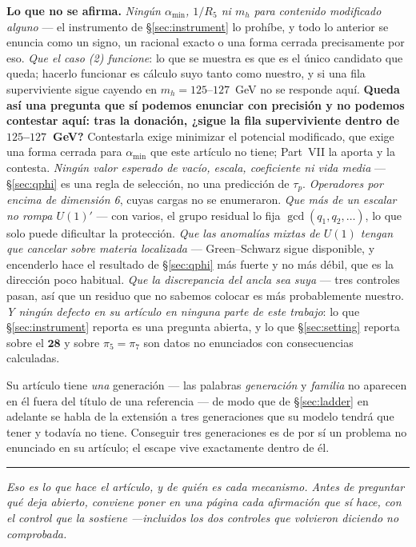 \documentclass[11pt,a4paper]{article}
\newcommand{\rep}[1]{\mathbf{#1}}
\newcommand{\amin}{\alpha_{\min}}
\newcommand{\bridge}[1]{\par\medskip\noindent
  \textcolor{hdrblue!45}{\rule{2.2cm}{0.6pt}}\;\;\parbox[t]{0.84\textwidth}{\small\itshape
  \textcolor{hdrblue!85}{#1}}\par\medskip}
\begin{document}
\textbf{Lo que no se afirma.}
\emph{Ningún $\amin$, $1/R_5$ ni $m_h$ para contenido modificado alguno} --- el instrumento de
\S\ref{sec:instrument} lo prohíbe, y todo lo anterior se enuncia como un signo, un racional exacto o
una forma cerrada precisamente por eso. \emph{Que el caso (2) funcione}: lo que se muestra es que es
el único candidato que queda; hacerlo funcionar es cálculo suyo tanto como nuestro, y si una fila
superviviente sigue cayendo en $m_h=125$--$127$~GeV no se responde aquí. \textbf{Queda así una
pregunta que sí podemos enunciar con precisión y no podemos contestar aquí: tras la donación,
¿sigue la fila superviviente dentro de $125$--$127$~GeV?} Contestarla exige minimizar el potencial
modificado, que exige una forma cerrada para $\amin$ que este artículo no tiene; Part~VII
\cite{PartVII} la aporta y la contesta.
\emph{Ningún valor esperado de vacío, escala, coeficiente ni vida media} --- \S\ref{sec:qphi} es una
regla de selección, no una predicción de $\tau_p$. \emph{Operadores por encima de dimensión 6}, cuyas
cargas no se enumeraron. \emph{Que más de un escalar no rompa $U(1)'$} --- con varios, el grupo
residual lo fija $\gcd(q_1,q_2,\dots)$, lo que solo puede dificultar la protección.
\emph{Que las anomalías mixtas de $U(1)$ tengan que cancelar sobre materia localizada} ---
Green--Schwarz sigue disponible, y encenderlo hace el resultado de \S\ref{sec:qphi} más fuerte y no
más débil, que es la dirección poco habitual. \emph{Que la discrepancia del ancla sea suya} --- tres
controles pasan, así que un residuo que no sabemos colocar es más probablemente nuestro. \emph{Y
ningún defecto en su artículo en ninguna parte de este trabajo}: lo que \S\ref{sec:instrument}
reporta es una pregunta abierta, y lo que \S\ref{sec:setting} reporta sobre el $\rep{28}$ y sobre
$\pi_5=\pi_7$ son datos no enunciados con consecuencias calculadas.

Su artículo tiene \emph{una} generación --- las palabras \emph{generación} y \emph{familia} no
aparecen en él fuera del título de una referencia --- de modo que de \S\ref{sec:ladder} en adelante
se habla de la extensión a tres generaciones que su modelo tendrá que tener y todavía no tiene.
Conseguir tres generaciones es de por sí un problema no enunciado en su artículo; el escape vive
exactamente dentro de él.

\bridge{Eso es lo que hace el artículo, y de quién es cada mecanismo. Antes de preguntar qué deja
abierto, conviene poner en una página cada afirmación que sí hace, con el control que la sostiene
---incluidos los dos controles que volvieron diciendo \emph{no comprobada}.}
\end{document}
